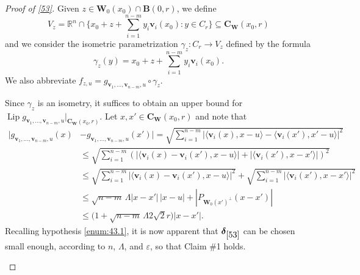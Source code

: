 \documentclass[JEP,XML,SOM,Unicode,ThmDefs,NoEqCountersInSection]{cedram}
\newcommand{\spfrac}[2]{\sfrac{#1}{(#2)}}
\newenvironment{Empty*}[2][\null]{%
\begin{enonce*}[remark]{#1}#2}
{\end{enonce*}}
\newcommand{\R}{\mathbb{R}}
\newcommand{\Rn}{\R^n}
\newcommand{\bdelta}{\boldsymbol{\delta}}
\newcommand{\bB}{{\boldsymbol{B}}}
\newcommand{\bC}{{\boldsymbol{C}}}
\newcommand{\bW}{{\boldsymbol{W}}}
\newcommand{\bv}{{\boldsymbol{v}}}
\DeclareMathOperator{\rmLip}{\mathrm{Lip}}
\let\veps\varepsilon
\let\la\langle
\let\ra\rangle
\let\subset\subseteq
\begin{document}
\begin{proof}[Proof of \ref{53}]
Given $z \in \bW_0(x_0) \cap \bB(0,r)$, we define
\begin{equation*}
V_z = \Rn \cap \bigl\{ x_0 + z + \textstyle\sum_{i=1}^{n-m} y_i \bv_i(x_0): y \in C_r \bigr\} \subset \bC_\bW(x_0,r)
\end{equation*}
and we consider the isometric parametrization $\gamma_z: C_r \to V_z$ defined by the formula
\begin{equation*}
\gamma_z(y) = x_0 + z + \sum_{i=1}^{n-m} y_i \bv_i(x_0).
\end{equation*}
We also abbreviate $f_{z,u} = g_{\bv_1,\ldots,\bv_{n-m},u} \circ \gamma_z$.

\begin{Empty*}[Claim \#1. $\rmLip f_{z,u} \leq (1 + \veps)^\spfrac{1}{n-m}$]
Since $\gamma_z$ is an isometry, it suffices to obtain an upper bound for $\rmLip g_{\bv_1,\ldots,\bv_{n-m},u}|_{\bC_\bW(x_0,r)}$.
Let $x,x' \in \bC_\bW(x_0,r)$ and note that
\begin{equation*}
\begin{split}
\big| g_{\bv_1,\ldots,\bv_{n-m},u}(x)& - g_{\bv_1,\ldots,\bv_{n-m},u}(x') \big| = \sqrt{\textstyle\sum_{i=1}^{n-m} \left| \la \bv_i(x),x-u\ra - \la \bv_i(x'),x'-u\ra \right|^2} \\
& \leq \sqrt{\textstyle\sum_{i=1}^{n-m} \left(\left| \la \bv_i(x)-\bv_i(x'),x-u\ra \right| + \left| \la \bv_i(x'),x-x' \ra \right|\right)^2} \\
&\leq \sqrt{\textstyle\sum_{i=1}^{n-m}\left| \la \bv_i(x)-\bv_i(x'),x-u\ra \right|^2} + \sqrt{\textstyle\sum_{i=1}^{n-m}\left| \la \bv_i(x'),x-x' \ra \right|^2}\\
& \leq \sqrt{n-m}\, \Lambda |x-x'|\,|x-u| + \left| P_{\bW_0(x')^\perp}(x-x') \right| \\
& \leq \bigl(1 + \sqrt{n-m}\, \Lambda 2 \sqrt{2}r \bigr) |x-x'|.
\end{split}
\end{equation*}
Recalling hypothesis \eqref{enum:43.1}, it is now apparent that $\bdelta_{\ref{53}}$ can be chosen small enough, according to $n$, $\Lambda$, and $\veps$, so that Claim \#1 holds.
\end{Empty*}


\end{proof}
\end{document}
